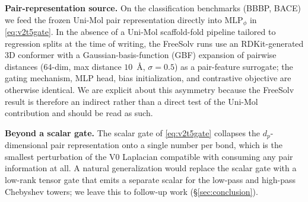 \documentclass[conference]{IEEEtran}
\begin{document}
\noindent\textbf{Pair-representation source.} On the classification benchmarks (BBBP, BACE) we feed the frozen Uni-Mol pair representation directly into $\mathrm{MLP}_\phi$ in \eqref{eq:v2t5gate}. In the absence of a Uni-Mol scaffold-fold pipeline tailored to regression splits at the time of writing, the FreeSolv runs use an RDKit-generated 3D conformer with a Gaussian-basis-function (GBF) expansion of pairwise distances (64-dim, max distance $10$~\AA, $\sigma{=}0.5$) as a pair-feature surrogate; the gating mechanism, MLP head, bias initialization, and contrastive objective are otherwise identical. We are explicit about this asymmetry because the FreeSolv result is therefore an indirect rather than a direct test of the Uni-Mol contribution and should be read as such.

\noindent\textbf{Beyond a scalar gate.} The scalar gate of \eqref{eq:v2t5gate} collapses the $d_p$-dimensional pair representation onto a single number per bond, which is the smallest perturbation of the V0 Laplacian compatible with consuming any pair information at all. A natural generalization would replace the scalar gate with a low-rank tensor gate that emits a separate scalar for the low-pass and high-pass Chebyshev towers; we leave this to follow-up work (\S\ref{sec:conclusion}).
\end{document}
